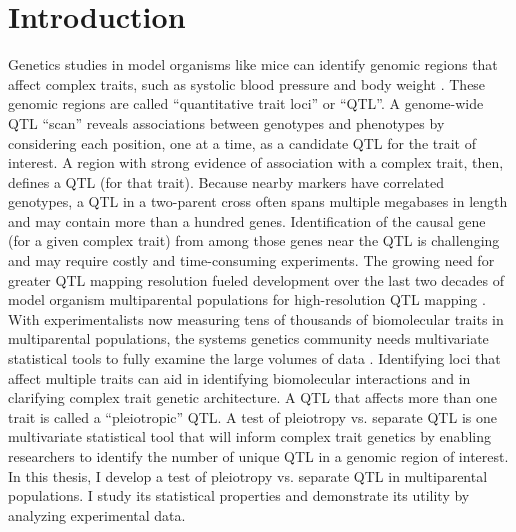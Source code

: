 \documentclass[oneside]{book}\usepackage[]{graphicx}\usepackage[]{color}
\begin{document}

%



\tableofcontents
\listoffigures
\listoftables
\mainmatter %

\chapter{Introduction}

Genetics studies in model organisms like mice can identify 
genomic regions that affect complex traits, such as systolic blood pressure and body weight \citep{sax1923association,lander1989mapping,broman2009guide,jansen2007quantitative}. These genomic regions are called ``quantitative trait loci'' or ``QTL''. 
A genome-wide QTL ``scan'' reveals
associations between genotypes and phenotypes by considering each position,
one at a time, as a candidate QTL for the trait of interest.
A region with strong evidence of association with a complex trait, then, defines a QTL (for that trait). 
Because nearby markers have correlated
genotypes, a QTL in a two-parent cross often spans multiple megabases in length
and may contain more than a hundred genes.
Identification of the causal gene (for a given complex trait) from among those genes near the QTL is
challenging and may require costly and time-consuming experiments. 
The growing need for greater QTL mapping resolution fueled development over the
last two decades of model organism multiparental populations for high-resolution QTL mapping \citep{de2017back,churchill2004collaborative,svenson2012high,huang2012multiparent,shivakumar2018soybean,huang2011analysis,kover2009multiparent,tisne2017identification,stanley2017genetic}.
With experimentalists now measuring tens of thousands of biomolecular traits 
in multiparental populations, the systems genetics community needs multivariate
statistical tools to fully examine the large volumes of data \citep{keller2018genetic,chick2016defining}. 
Identifying loci that affect multiple traits can aid in identifying biomolecular interactions and in clarifying complex trait genetic architecture. A QTL that affects more than one trait is called a ``pleiotropic'' QTL. 
A test of pleiotropy vs. separate QTL is one multivariate statistical tool that will inform
complex trait genetics by enabling researchers to identify the number of
unique QTL in a genomic region of interest.
In this thesis, I develop a test of pleiotropy vs. separate QTL in multiparental
populations. I study its statistical properties and demonstrate its utility
by analyzing experimental data. 
\end{document}
